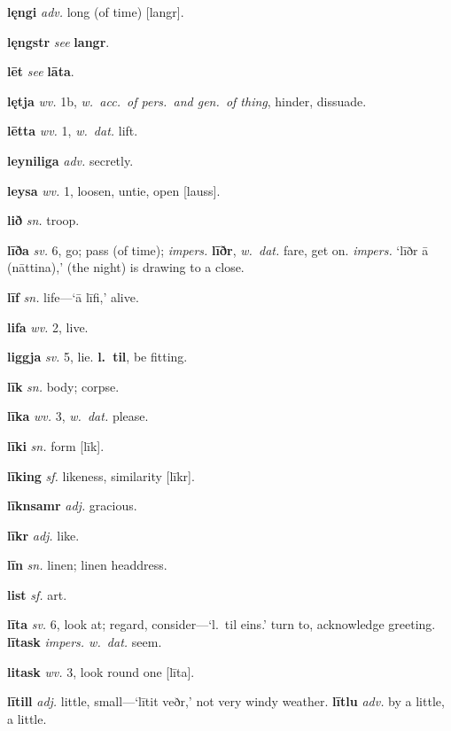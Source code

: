 \documentclass[12pt,letterpaper]{book}
\begin{document}
\noindent
\textbf{lęngi} \textit{adv.} long (of time) [langr].

\noindent
\textbf{lęngstr} \textit{} \textit{see} \textbf{langr}.

\noindent
\textbf{lēt} \textit{} \textit{see} \textbf{lāta}.

\noindent
\textbf{lętja} \textit{wv.} 1b, \textit{w.\ acc.\ of pers.\ and gen.\ of thing},
	hinder, dissuade.

\noindent
\textbf{lētta} \textit{wv.} 1, \textit{w.\ dat.} lift.

\noindent
\textbf{leyniliga} \textit{adv.} secretly.

\noindent
\textbf{leysa} \textit{wv.} 1, loosen, untie, open [lauss].

\noindent
\textbf{lið} \textit{sn.} troop.

\noindent
\textbf{līða} \textit{sv.} 6, go; pass (of time); \textit{impers.} \textbf{līðr},
	\textit{w.\ dat.} fare, get on.  \textit{impers.} `līðr ā (nāttina),' (the
	night) is drawing to a close.

\noindent
\textbf{līf} \textit{sn.} life---`ā līfi,' alive.

\noindent
\textbf{lifa} \textit{wv.} 2, live.

\noindent
\textbf{liggja} \textit{sv.} 5, lie.  \textbf{l.\ til}, be fitting.

\noindent
\textbf{līk} \textit{sn.} body; corpse.

\noindent
\textbf{līka} \textit{wv.} 3, \textit{w.\ dat.} please.

\noindent
\textbf{līki} \textit{sn.} form [līk].

\noindent
\textbf{līking} \textit{sf.} likeness, similarity [līkr].

\noindent
\textbf{līknsamr} \textit{adj.} gracious.

\noindent
\textbf{līkr} \textit{adj.} like.

\noindent
\textbf{līn} \textit{sn.} linen; linen headdress.

\noindent
\textbf{list} \textit{sf.} art.

\noindent
\textbf{līta} \textit{sv.} 6, look at; regard, consider---`l.\ til
	eins.' turn to, acknowledge greeting.  \textbf{lītask} \textit{impers.
	w.\ dat.} seem.

\noindent
\textbf{litask} \textit{wv.} 3, look round one [līta].

\noindent
\textbf{lītill} \textit{adj.} little, small---`lītit veðr,' not very
	windy weather.  \textbf{lītlu} \textit{adv.} by a little, a little.
\end{document}

